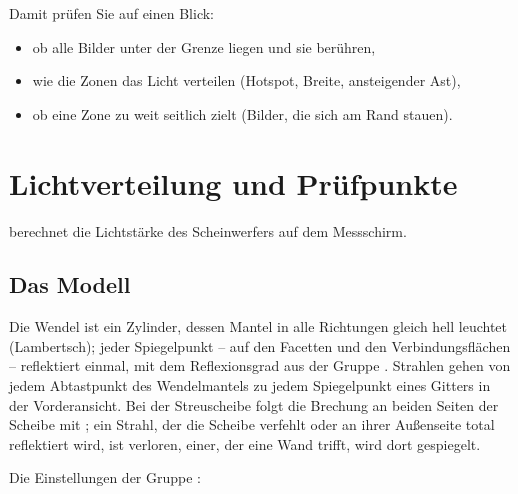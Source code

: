 Damit prüfen Sie auf einen Blick:
\begin{itemize}
  \item ob alle Bilder unter der Grenze liegen und sie berühren,
  \item wie die Zonen das Licht verteilen (Hotspot, Breite, ansteigender Ast),
  \item ob eine Zone zu weit seitlich zielt (Bilder, die sich am Rand stauen).
\end{itemize}

\section{Lichtverteilung und Prüfpunkte}\label{sec:al-lichtverteilung}

 berechnet die Lichtstärke des Scheinwerfers auf dem Messschirm.

\subsection{Das Modell}

Die Wendel ist ein Zylinder, dessen Mantel in alle Richtungen gleich hell leuchtet (Lambertsch); jeder
Spiegelpunkt -- auf den Facetten und den Verbindungsflächen -- reflektiert einmal, mit dem
Reflexionsgrad aus der Gruppe . Strahlen gehen von jedem Abtastpunkt des Wendelmantels zu
jedem Spiegelpunkt eines Gitters in der Vorderansicht. Bei der Streuscheibe folgt die Brechung an
beiden Seiten der Scheibe mit ; ein Strahl, der die Scheibe verfehlt oder an ihrer
Außenseite total reflektiert wird, ist verloren, einer, der eine Wand trifft, wird dort gespiegelt.

Die Einstellungen der Gruppe :

